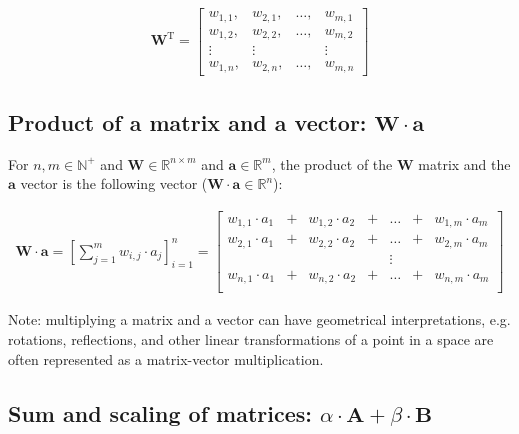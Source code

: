 \documentclass[titlepage]{article}
\begin{document}
        \begin{align*}
          \mathbf{W}^\mathrm{T}
            = \begin{bmatrix}
                w_{1,1}, & w_{2,1}, & \ldots, & w_{m,1} \\
                w_{1,2}, & w_{2,2}, & \ldots, & w_{m,2} \\
                \vdots & \vdots & & \vdots \\
                w_{1,n}, & w_{2,n}, & \ldots, & w_{m,n}
              \end{bmatrix}
        \end{align*}

      \subsection{%
        Product of a matrix and a vector: $\mathbf{W} \cdot \mathbf{a}$
      }

        For $n, m \in \mathbb{N}^+$ and
        $\mathbf{W} \in \mathbb{R}^{n \times m}$ and
        $\mathbf{a} \in \mathbb{R}^m$, the product of the $\mathbf{W}$ matrix
        and the $\mathbf{a}$ vector is the following vector
        ($\mathbf{W} \cdot \mathbf{a} \in \mathbb{R}^n$):

        \begin{align*}
          \mathbf{W} \cdot \mathbf{a}
            = \left[ \sum_{j=1}^m w_{i,j} \cdot a_j \right]_{i=1}^n
            = \begin{bmatrix}
                w_{1,1} \cdot a_1 & + & w_{1,2} \cdot a_2
                  & + & \ldots & + & w_{1,m} \cdot a_m  \\
                w_{2,1} \cdot a_1 & + & w_{2,2} \cdot a_2
                  & + & \ldots & + & w_{2,m} \cdot a_m  \\
                & & & & \vdots & & \\
                w_{n,1} \cdot a_1 & + & w_{n,2} \cdot a_2
                  & + & \ldots & + & w_{n,m} \cdot a_m  \\
              \end{bmatrix}
        \end{align*}

        Note: multiplying a matrix and a vector can have geometrical
        interpretations, e.g. rotations, reflections, and other linear
        transformations of a point in a space are often represented as a
        matrix-vector multiplication.

      \subsection{%
        Sum and scaling of matrices:
        $\alpha \cdot \mathbf{A} + \beta \cdot \mathbf{B}$
      }
\end{document}
